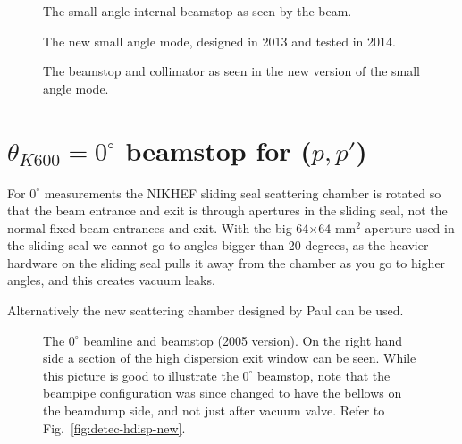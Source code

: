 \documentclass[11pt]{report}
\begin{document}
\begin{figure}[!ht]
\centerline{\vspace{0cm}\hspace{0cm}
}
\centering
\caption{The small angle internal beamstop as seen by the beam.}
\label{fig:smallangle-beamstop-2}
\end{figure} 

\begin{figure}[!ht]
\centerline{\vspace{0cm}\hspace{0cm}
}
\centering
\caption{The new small angle mode, designed in 2013 and tested in 2014.}
\label{fig:smallangle-mode}
\end{figure} 


\begin{figure}[!ht]
\centerline{\vspace{0cm}\hspace{0cm}
}
\centering
\caption{The beamstop and collimator as seen in the new version of the small angle mode.}
\label{fig:smallangle-mode-picture}
\end{figure} 




\section{$\theta_{K600}=0^{\circ}$ beamstop for ($p,p'$)}

For $0^{\circ}$ measurements the NIKHEF sliding seal scattering chamber is rotated so that the beam entrance
and exit is through apertures in the sliding seal, not the normal fixed beam entrances and
exit.  With the big 64$\times$64 mm$^2$ aperture used in the sliding seal we cannot go to angles
bigger than 20 degrees, as the heavier hardware on the sliding seal pulls it away from the
chamber as you go to higher angles, and this creates vacuum leaks.

Alternatively the new scattering chamber designed by Paul can be used. 

\begin{figure}[!ht]
\centerline{\vspace{0cm}\hspace{0cm}
}
\centering
\caption{The $0^{\circ}$ beamline and beamstop (2005 version). On the right hand side a section of the high dispersion exit window can be seen. While this picture is good to illustrate the $0^{\circ}$ beamstop, note that the beampipe configuration was since changed to have the bellows on the beamdump side, and not just after vacuum valve.  Refer to Fig.~\ref{fig:detec-hdisp-new}. }
\label{fig:zerod-beamstop-pic}
\end{figure} 
\end{document}
